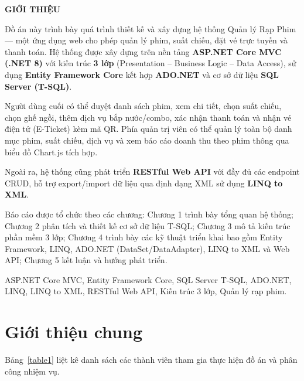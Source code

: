\documentclass[12pt,a4paper,oneside]{book}
\theoremstyle{plain}
\numberwithin{equation}{chapter}
\begin{document}
\begin{center}
  \large{\textbf{GIỚI THIỆU}}\\
\end{center}

Đồ án này trình bày quá trình thiết kế và xây dựng hệ thống Quản lý Rạp Phim --- một ứng dụng web cho phép quản lý phim, suất chiếu, đặt vé trực tuyến và thanh toán. Hệ thống được xây dựng trên nền tảng \textbf{ASP.NET Core MVC (.NET 8)} với kiến trúc \textbf{3 lớp} (Presentation -- Business Logic -- Data Access), sử dụng \textbf{Entity Framework Core} kết hợp \textbf{ADO.NET} và cơ sở dữ liệu \textbf{SQL Server (T-SQL)}.

Người dùng cuối có thể duyệt danh sách phim, xem chi tiết, chọn suất chiếu, chọn ghế ngồi, thêm dịch vụ bắp nước/combo, xác nhận thanh toán và nhận vé điện tử (E-Ticket) kèm mã QR. Phía quản trị viên có thể quản lý toàn bộ danh mục phim, suất chiếu, dịch vụ và xem báo cáo doanh thu theo phim thông qua biểu đồ Chart.js tích hợp.

Ngoài ra, hệ thống cũng phát triển \textbf{RESTful Web API} với đầy đủ các endpoint CRUD, hỗ trợ export/import dữ liệu qua định dạng XML sử dụng \textbf{LINQ to XML}.

Báo cáo được tổ chức theo các chương: Chương 1 trình bày tổng quan hệ thống; Chương 2 phân tích và thiết kế cơ sở dữ liệu T-SQL; Chương 3 mô tả kiến trúc phần mềm 3 lớp; Chương 4 trình bày các kỹ thuật triển khai bao gồm Entity Framework, LINQ, ADO.NET (DataSet/DataAdapter), LINQ to XML và Web API; Chương 5 kết luận và hướng phát triển.

 ASP.NET Core MVC, Entity Framework Core, SQL Server T-SQL, ADO.NET, LINQ, LINQ to XML, RESTful Web API, Kiến trúc 3 lớp, Quản lý rạp phim.

\newpage
\tableofcontents

\newpage
{}
\listoffigures

\newpage
{}
\listoftables

\newpage
{}

\chapter{Giới thiệu chung}

\noindent Bảng~\ref{table1} liệt kê danh sách các thành viên tham gia thực hiện đồ án và phân công nhiệm vụ.
\end{document}
